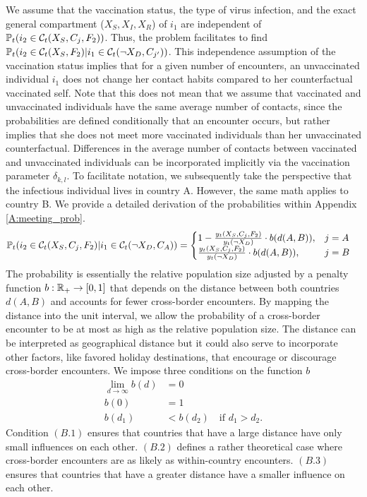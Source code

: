 We assume that the vaccination status, the type of virus infection, and the exact general compartment ($X_S, X_I, X_R$) of $i_1$ are independent of $\mathbb{P}_t(i_2 \in \mathcal{C}_t(X_S, C_j, F_2)) $. Thus, the problem facilitates to find $\mathbb{P}_t(i_2 \in \mathcal{C}_t(X_S, F_2) | i_1 \in \mathcal{C}_t(\neg X_D, C_{j'}))$. 
This independence assumption of the vaccination status implies that for a given number of encounters, an unvaccinated individual $i_1$ does not change her contact habits compared to her counterfactual vaccinated self. Note that this does not mean that we assume that vaccinated and unvaccinated individuals have the same average number of contacts, since the probabilities are defined conditionally that an encounter occurs, but rather implies that she does not meet more vaccinated individuals than her unvaccinated counterfactual. Differences in the average number of contacts between vaccinated and unvaccinated individuals can be incorporated implicitly via the vaccination parameter $\delta_{k,l}$. To facilitate notation, we subsequently take the perspective that the infectious individual lives in country A. However, the same math applies to country B. We provide a detailed derivation of the probabilities within Appendix \ref{A:meeting_prob}.
\begin{align}
\label{eq:cond_meeting_prob}
\mathbb{P}_t(i_2 \in \mathcal{C}_t(X_S, C_j, F_2)|i_1 \in \mathcal{C}_t(\neg X_D, C_A)) &= \begin{cases} 
      1-\frac{y_t(X_S, C_j, F_2)}{y_t(\neg X_D)} \cdot b(d(A, B)), & j = A \\
      \frac{y_t(X_S, C_j, F_2)}{y_t(\neg X_D)} \cdot b(d(A, B)), & j = B 
   \end{cases}
\end{align}
The probability is essentially the relative population size adjusted by a penalty function $b: \mathbb{R}_+ \to [0,1]$ that depends on the distance between both countries $d(A, B)$ and accounts for fewer cross-border encounters. By mapping the distance into the unit interval, we allow the probability of a cross-border encounter to be at most as high as the relative population size. The distance can be interpreted as geographical distance but it could also serve to incorporate other factors, like favored holiday destinations, that encourage or discourage cross-border encounters. We impose three conditions on the function $b$
\begin{align}
\lim_{d \to \infty} b(d) &= 0 \tag{B.1}\\
b(0) &= 1 \tag{B.2}\\
b(d_1) &< b(d_2) \quad \textrm{if } d_1 > d_2. \tag{B.3}
\end{align}
Condition $(B.1)$ ensures that countries that have a large distance have only small influences on each other. $(B.2)$ defines a rather theoretical case where cross-border encounters are as likely as within-country encounters. $(B.3)$ ensures that countries that have a greater distance have a smaller influence on each other. \\

